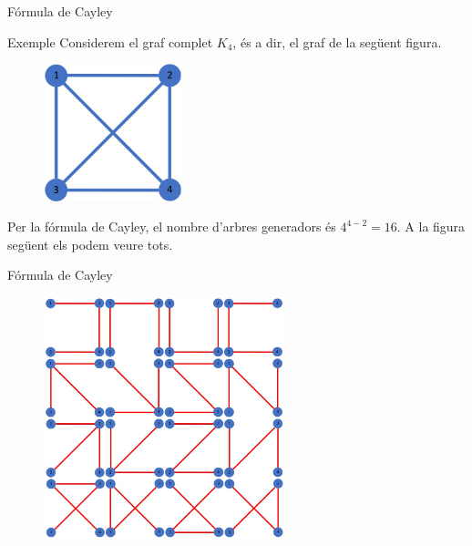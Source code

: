 \documentclass{beamer}
\begin{document}
\begin{frame}{Fórmula de Cayley}
    \begin{exampleblock}{Exemple}
        Considerem el graf complet $K_4$, és a dir, el graf de la següent figura.
        \begin{figure}[ht]
            \centering
            \includegraphics[width=4cm]{Imatges/graf2.jpg}
        \end{figure}\pause
        Per la fórmula de Cayley, el nombre d'arbres generadors és $4^{4-2} = 16$. A la figura següent els podem veure tots.
    \end{exampleblock}
\end{frame}
\begin{frame}{Fórmula de Cayley}
    \begin{exampleblock}{}
        \begin{figure}[ht]
            \centering
            \includegraphics[width=7cm]{Imatges/graf2_16.jpg}
        \end{figure}
    \end{exampleblock}
\end{frame}
\end{document}
